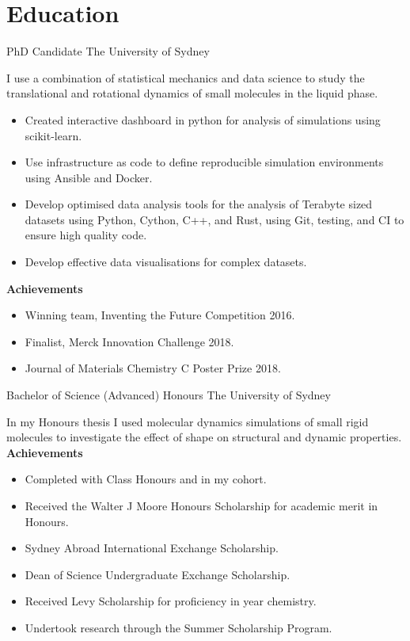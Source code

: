 



\makecvtitle{}

\vspace{-4em}
\section{Education}

{PhD Candidate}
{The University of Sydney}{}{}
{%
  I use a combination of statistical mechanics and data science to
  study the translational and rotational dynamics
  of small molecules in the liquid phase.
\begin{itemize}
  \item Created interactive dashboard in python for analysis of simulations
    using scikit-learn.
  \item Use infrastructure as code to define reproducible simulation environments
    using Ansible and Docker.
  \item Develop optimised data analysis tools for the analysis of Terabyte sized
    datasets using Python, Cython, C++, and Rust,
    using Git, testing, and CI to ensure high quality code.
  \item Develop effective data visualisations for complex datasets.
\end{itemize}
\textbf{Achievements}
\begin{itemize}
  \item Winning team, Inventing the Future Competition 2016.
  \item Finalist, Merck Innovation Challenge 2018.
  \item Journal of Materials Chemistry C Poster Prize 2018.
\end{itemize}
}

{Bachelor of Science (Advanced) Honours}
{The University of Sydney}{}{}
{%
  In my Honours thesis
  I used molecular dynamics simulations of small rigid molecules
  to investigate the effect of shape on structural and dynamic properties.\\
\textbf{Achievements}
\begin{itemize}
  \item Completed with  Class Honours and  in my cohort.
  \item Received the Walter J Moore Honours Scholarship for academic merit in Honours.
  \item Sydney Abroad International Exchange Scholarship.
  \item Dean of Science Undergraduate Exchange Scholarship.
  \item Received Levy Scholarship for proficiency in  year chemistry.
  \item Undertook research through the Summer Scholarship Program.
\end{itemize}
}

